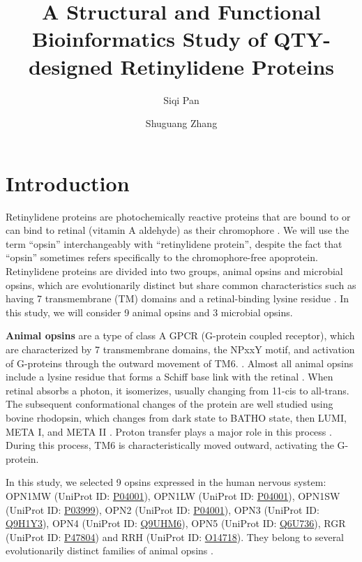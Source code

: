 \documentclass[fleqn, 10pt, lineno]{manuscript}
\title{A Structural and Functional Bioinformatics Study of QTY-designed Retinylidene Proteins}
\author[1]{Siqi Pan}
\author[2]{Shuguang Zhang}
\affil[1]{Shanghai World Foreign Language Academy, 400 Baihua Street, Shanghai 200233, China}
\affil[2]{Lab of Molecular Architecture, Media Lab, Massachusetts Institute of Technology, 77 Massachusetts Avenue, Cambridge, MA 02139, USA}
\begin{document}
\flushbottom
\maketitle
\thispagestyle{empty}

\section*{Introduction}

Retinylidene proteins are photochemically reactive proteins that are bound to or can bind to retinal (vitamin A aldehyde) as their chromophore \citep{Spudich_2000}. We will use the term ``opsin'' interchangeably with ``retinylidene protein'', despite the fact that ``opsin'' sometimes refers specifically to the chromophore-free apoprotein. Retinylidene proteins are divided into two groups, animal opsins and microbial opsins, which are evolutionarily distinct but share common characteristics such as having 7 transmembrane (TM) domains and a retinal-binding lysine residue \citep{Yee_2013, Spudich_2000}. In this study, we will consider 9 animal opsins and 3 microbial opsins. 

\textbf{Animal opsins} are a type of class A GPCR (G-protein coupled receptor), which are characterized by 7 transmembrane domains, the NPxxY motif, and activation of G-proteins through the outward movement of TM6. \citep{Zhou_2019}. Almost all animal opsins include a lysine residue that forms a Schiff base link with the retinal \citep{Guhmann_2022}. When retinal absorbs a photon, it isomerizes, usually changing from 11-cis to all-trans. The subsequent conformational changes of the protein are well studied using bovine rhodopsin, which changes from dark state to BATHO state, then LUMI, META I, and META II \citep{Okada_2001}. Proton transfer plays a major role in this process \citep{Mahalingam_2008}. During this process, TM6 is characteristically moved outward, activating the G-protein. 

In this study, we selected 9 opsins expressed in the human nervous system: OPN1MW (UniProt ID: \href{https://www.uniprot.org/uniprotkb/P04001/entry}{P04001}), OPN1LW (UniProt ID: \href{https://www.uniprot.org/uniprotkb/P04000/entry}{P04001}), OPN1SW (UniProt ID: \href{https://www.uniprot.org/uniprotkb/P03999/entry}{P03999}), OPN2 (UniProt ID: \href{https://www.uniprot.org/uniprotkb/P08100/entry}{P04001}), OPN3 (UniProt ID: \href{https://www.uniprot.org/uniprotkb/Q9H1Y3/entry}{Q9H1Y3}), OPN4 (UniProt ID: \href{https://www.uniprot.org/uniprotkb/Q9UHM6/entry}{Q9UHM6}), OPN5 (UniProt ID: \href{https://www.uniprot.org/uniprotkb/Q6U736/entry}{Q6U736}), RGR (UniProt ID: \href{https://www.uniprot.org/uniprotkb/P47804/entry}{P47804}) and RRH (UniProt ID: \href{https://www.uniprot.org/uniprotkb/O14718/entry}{O14718}). They belong to several evolutionarily distinct families of animal opsins \citep{Terakita_2005}. 
\end{document}
